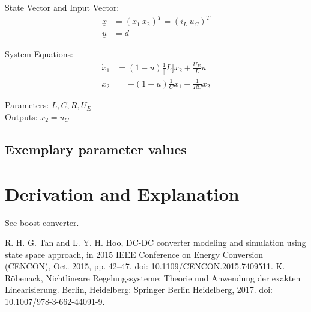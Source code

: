 \documentclass[10pt,a4paper]{article}
\begin{document}
	State Vector and Input Vector:
	\begin{align*}
		\underline{x} &= (x_1 \ x_2)^T = (i_L \ u_C)^T \\
		\underline{u} &= d
	\end{align*}
	
	\noindent System Equations:			
	\begin{subequations}
	\begin{align}
		\dot{x}_1 &= (1-u)\frac{1}[L]x_2 + \frac{U_E}{L}u \\
		\dot{x}_2 &= -(1-u)\frac{1}{C}x_1 - \frac{1}{RC}x_2
	\end{align}
	\end{subequations}

	\noindent
	Parameters: $L, C, R, U_E$ %
	\\
	Outputs: $x_2 = u_C$
	
	
	
	
	\subsection{Exemplary parameter values}
	

	
	\section{Derivation and Explanation} %
	See boost converter.
	
	
	\begin{thebibliography}{10}		
		R. H. G. Tan and L. Y. H. Hoo, DC-DC converter modeling and simulation using state space approach, in 2015 IEEE Conference on Energy Conversion (CENCON), Oct. 2015, pp. 42–47. doi: 10.1109/CENCON.2015.7409511.
		K. Röbenack, Nichtlineare Regelungssysteme: Theorie und Anwendung der exakten Linearisierung. Berlin, Heidelberg: Springer Berlin Heidelberg, 2017. doi: 10.1007/978-3-662-44091-9.
	\end{thebibliography}
\end{document}
